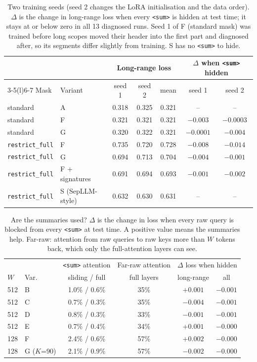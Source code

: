 \documentclass[11pt]{article}
\newcommand{\sumtok}{\texttt{<sum>}}
\begin{document}
\begin{table}[t]
\centering\small
\begin{tabular}{@{}llccccc@{}}
\toprule
& & \multicolumn{3}{c}{Long-range loss} & \multicolumn{2}{c}{$\Delta$ when \sumtok{} hidden} \\
\cmidrule(lr){3-5}\cmidrule(l){6-7}
Mask & Variant & seed 1 & seed 2 & mean & seed 1 & seed 2 \\
\midrule
standard & A & 0.318 & 0.325 & 0.321 & -- & -- \\
standard & F & 0.321 & 0.321 & 0.321 & $-0.003$ & $-0.0003$ \\
standard & G & 0.320 & 0.322 & 0.321 & $-0.0001$ & $-0.004$ \\
\texttt{restrict\_full} & F & 0.735 & 0.720 & 0.728 & $-0.008$ & $-0.014$ \\
\texttt{restrict\_full} & G & 0.694 & 0.713 & 0.704 & $-0.004$ & $-0.001$ \\
\texttt{restrict\_full} & F + signatures & 0.691 & 0.694 & 0.693 & $-0.001$ & $-0.002$ \\
\texttt{restrict\_full} & S (SepLLM-style) & 0.632 & 0.630 & 0.631 & -- & -- \\
\bottomrule
\end{tabular}
\caption{Two training seeds (seed 2 changes the LoRA initialisation and the
data order). $\Delta$ is the change in long-range loss when every \sumtok{}
is hidden at test time; it stays at or below zero in all 13 diagnosed runs.
Seed 1 of F (standard mask) was trained before long scopes moved their
header into the first part and diagnosed after, so its segments differ
slightly from training. S has no \sumtok{} to hide.}
\label{tab:seeds}
\end{table}

\begin{table}[t]
\centering\small
\begin{tabular}{@{}llcccc@{}}
\toprule
& & \sumtok{} attention & Far-raw attention & \multicolumn{2}{c}{$\Delta$ loss when hidden} \\
$W$ & Var. & sliding / full & full layers & long-range & all \\
\midrule
512 & B & 1.0\% / 0.6\% & 35\% & $+0.001$ & $-0.001$ \\
512 & C & 0.7\% / 0.3\% & 35\% & $-0.004$ & $-0.001$ \\
512 & D & 0.8\% / 0.3\% & 33\% & $-0.001$ & $-0.001$ \\
512 & E & 0.7\% / 0.4\% & 34\% & $+0.001$ & $-0.000$ \\
128 & F & 2.4\% / 0.6\% & 57\% & $+0.002$ & $-0.000$ \\
128 & G ($K$=90) & 2.1\% / 0.9\% & 57\% & $-0.002$ & $-0.000$ \\
\bottomrule
\end{tabular}
\caption{Are the summaries used? $\Delta$ is the change in loss when every raw
query is blocked from every \sumtok{} at test time. A positive value means the
summaries help. Far-raw: attention from raw queries to raw keys more than $W$
tokens back, which only the full-attention layers can see.}
\label{tab:diag}
\end{table}
\end{document}
